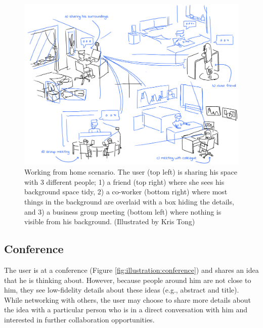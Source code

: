 \begin{figure}
    \centering
    \includegraphics[width=\linewidth]{images/30-continuum/illustrations/2_Group_Meeting.png}
    \caption{Working from home scenario. The user (top left) is sharing his space with 3 different people; 1) a friend (top right) where she sees his background space tidy, 2) a co-worker (bottom right) where most things in the background are overlaid with a box hiding the details, and 3) a business group meeting (bottom left) where nothing is visible from his background.
    (Illustrated by Kris Tong)}
    \label{fig:illustration:group-meeting}
\end{figure}

\subsection{Conference}

The user is at a conference (Figure \ref{fig:illustration:conference}) and shares an idea that he is thinking about. However, because people around him are not close to him, they see low-fidelity details about these ideas (e.g., abstract and title). While networking with others, the user may choose to share more details about the idea with a particular person who is in a direct conversation with him and interested in further collaboration opportunities.

